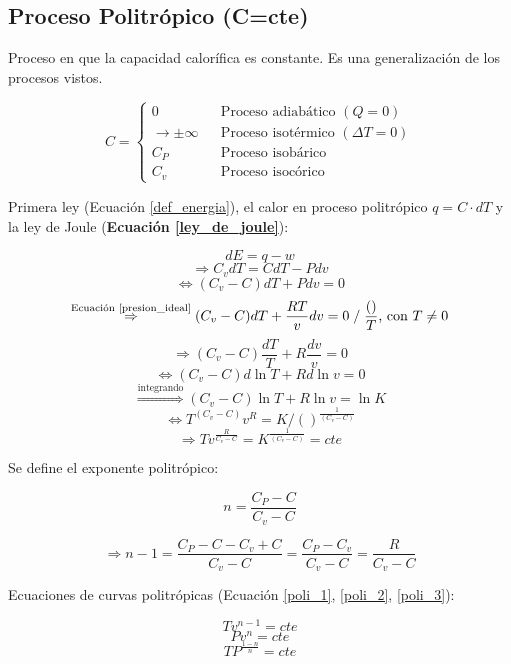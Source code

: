     \subsection{Proceso Politrópico (C=cte)}
    
    Proceso en que la capacidad calorífica es constante. Es una generalización de los procesos vistos.
    
    \begin{equation}
        C = \left \{
        \begin{matrix}
            0 & & \text{Proceso adiabático }(Q=0)\\
            \rightarrow \pm \infty & & \text{Proceso isotérmico }(\Delta T = 0)\\
            C_{P} & & \text{Proceso isobárico}\\
            C_{v} & & \text{Proceso isocórico}
        \end{matrix}
        \right .
    \end{equation}

    Primera ley (Ecuación \ref{def_energia}), el calor en proceso politrópico \(q=C\cdot dT\) y la ley de Joule (\textbf{Ecuación \ref{ley_de_joule}}):
    
    \[dE = q - w\]
    \[\Rightarrow C_{v}dT=CdT - Pdv\]
    \[\Leftrightarrow (C_{v} - C)dT + Pdv = 0\]
    \[\overset{\text{Ecuación \ref{presion_ideal}}}{\Rightarrow} (C_{v} - C)dT + \frac{RT}{v}dv = 0\;/\;\frac{()}{T}\text{, con }T \neq 0\]
    \[\Rightarrow (C_{v}-C)\frac{dT}{T} + R\frac{dv}{v}=0\]
    \[\Leftrightarrow (C_{v}-C)d\ln T + Rd\ln v=0\]
    \[\overset{\text{integrando}}{\Rightarrow}(C_{v}-C)\ln T + R\ln v=\ln K\]
    \[\Leftrightarrow T^{(C_{v}-C)}v^{R}=K /{()}^{\frac{1}{(C_{v}-C)}}\]
    \[\Rightarrow Tv^{\frac{R}{C_{v}-C}}=K^{\frac{1}{(C_{v}-C)}}=cte\]
    
    Se define el exponente politrópico:
    
    \begin{equation}
        n=\frac{C_{P}-C}{C_{v}-C}
    \end{equation}
    
    \[\Rightarrow n-1=\frac{C_{P}-C-C_{v}+C}{C_{v}-C}=\frac{C_{P}-C_{v}}{C_{v}-C}=\frac{R}{C_{v}-C}\]
    
    Ecuaciones de curvas politrópicas (Ecuación \ref{poli_1}, \ref{poli_2}, \ref{poli_3}):
    
    \begin{equation}
    \label{poli_1}
        Tv^{n-1}=cte
    \end{equation}
    \begin{equation}
    \label{poli_2}
        Pv^{n}=cte
    \end{equation}
    \begin{equation}
    \label{poli_3}
        TP^{\frac{1-n}{n}}=cte
    \end{equation}
    

